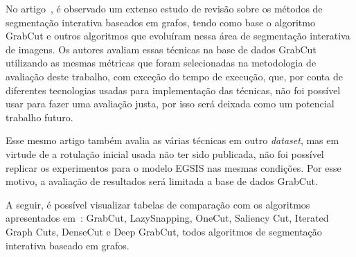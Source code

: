 No artigo~, é observado um extenso estudo de
revisão sobre os métodos de segmentação interativa baseados em grafos,
tendo como base o algoritmo GrabCut e outros algoritmos que evoluíram
nessa área de segmentação interativa de imagens. Os autores avaliam
essas técnicas na base de dados GrabCut~\cite{rother2004grabcut}
utilizando as mesmas métricas que foram selecionadas na metodologia de
avaliação deste trabalho, com exceção do tempo de execução, que, por
conta de diferentes tecnologias usadas para implementação das
técnicas, não foi possível usar para fazer uma avaliação justa, por
isso será deixada como um potencial trabalho futuro.

Esse mesmo artigo também avalia as várias técnicas em outro
\textit{dataset}, mas em virtude de a rotulação inicial usada não ter
sido publicada, não foi possível replicar os experimentos para o
modelo \gls{EGSIS} nas mesmas condições. Por esse motivo, a avaliação
de resultados será limitada a base de dados GrabCut.

A seguir, é possível visualizar tabelas de comparação com os
algoritmos apresentados em~: GrabCut,
LazySnapping, OneCut, Saliency Cut, Iterated Graph Cuts, DenseCut e
Deep GrabCut, todos algoritmos de segmentação interativa baseado em grafos.


